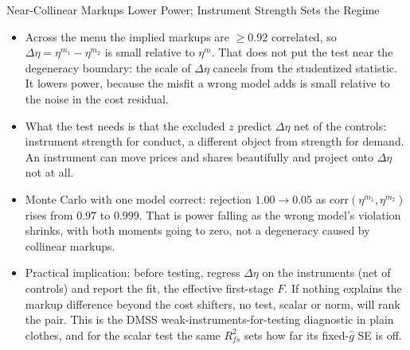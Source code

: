 \documentclass[aspectratio=169,10pt]{beamer}
\begin{document}
\begin{frame}{Near-Collinear Markups Lower Power; Instrument Strength Sets the Regime}
\begin{itemize}
\item Across the menu the implied markups are $\geq 0.92$ correlated, so $\Delta\eta = \eta^{m_1} - \eta^{m_2}$ is small relative to $\eta^m$. That does \alert{not} put the test near the degeneracy boundary: the scale of $\Delta\eta$ cancels from the studentized statistic. It lowers power, because the misfit a wrong model adds is small relative to the noise in the cost residual.
\item What the test needs is that the excluded $z$ predict $\Delta\eta$ net of the controls: \alert{instrument strength for conduct}, a different object from strength for demand. An instrument can move prices and shares beautifully and project onto $\Delta\eta$ not at all.
\item Monte Carlo with one model correct: rejection $1.00 \rightarrow 0.05$ as $\text{corr}(\eta^{m_1}, \eta^{m_2})$ rises from $0.97$ to $0.999$. That is power falling as the wrong model's violation shrinks, with both moments going to zero, not a degeneracy caused by collinear markups.
\item Practical implication: before testing, regress $\Delta\eta$ on the instruments (net of controls) and report the fit, the effective first-stage $F$. If nothing explains the markup difference beyond the cost shifters, no test, scalar or norm, will rank the pair. This is the DMSS weak-instruments-for-testing diagnostic in plain clothes, and for the scalar test the same $R^2_{fs}$ sets how far its fixed-$\widehat{g}$ SE is off.
\end{itemize}
\end{frame}
\end{document}
